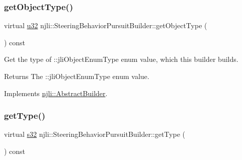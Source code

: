 \mbox{\label{classnjli_1_1_steering_behavior_pursuit_builder_a7020e317295e8b44e54ef39a3480b15d}} 
\subsubsection{\texorpdfstring{get\+Object\+Type()}{getObjectType()}}
{\footnotesize\ttfamily virtual \mbox{\hyperlink{_util_8h_a10e94b422ef0c20dcdec20d31a1f5049}{u32}} njli\+::\+Steering\+Behavior\+Pursuit\+Builder\+::get\+Object\+Type (\begin{DoxyParamCaption}{ }\end{DoxyParamCaption}) const\hspace{0.3cm}{\ttfamily [virtual]}}

Get the type of \+::jli\+Object\+Enum\+Type enum value, which this builder builds.

\begin{DoxyReturn}{Returns}
The \+::jli\+Object\+Enum\+Type enum value. 
\end{DoxyReturn}


Implements \mbox{\hyperlink{classnjli_1_1_abstract_builder_a0f2d344fcf697b167f4f2b1122b5fb33}{njli\+::\+Abstract\+Builder}}.

\mbox{\label{classnjli_1_1_steering_behavior_pursuit_builder_a7cce21b1009ed33ab95c8dd9b8f34451}} 
\subsubsection{\texorpdfstring{get\+Type()}{getType()}}
{\footnotesize\ttfamily virtual \mbox{\hyperlink{_util_8h_aa62c75d314a0d1f37f79c4b73b2292e2}{s32}} njli\+::\+Steering\+Behavior\+Pursuit\+Builder\+::get\+Type (\begin{DoxyParamCaption}{ }\end{DoxyParamCaption}) const\hspace{0.3cm}{\ttfamily [virtual]}}

